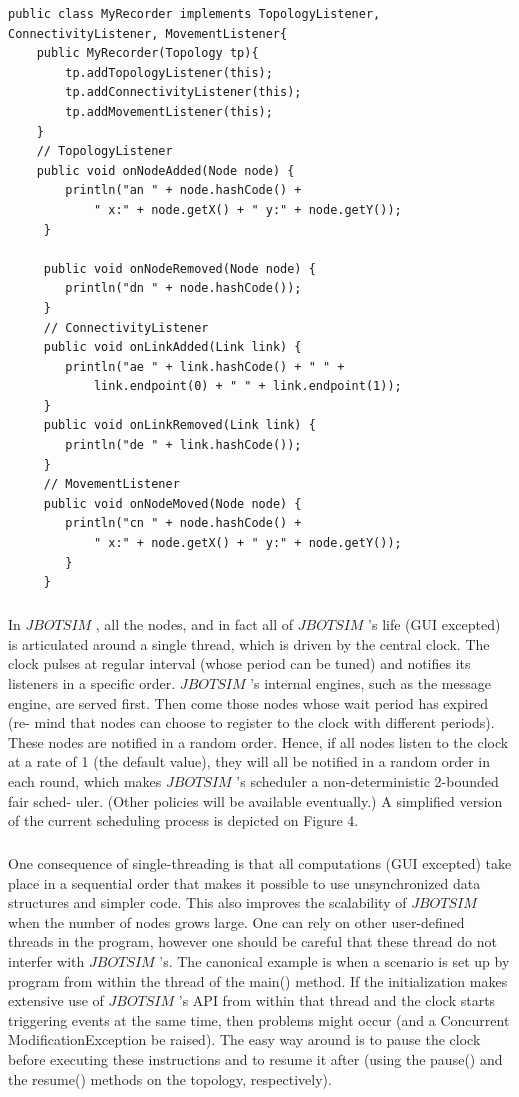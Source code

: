 \begin{lstlisting}[caption=Centralized version of Random Waypoint, captionpos=b]
public class MyRecorder implements TopologyListener, ConnectivityListener, MovementListener{
	public MyRecorder(Topology tp){
		tp.addTopologyListener(this);
		tp.addConnectivityListener(this);
		tp.addMovementListener(this);
	}
	// TopologyListener
	public void onNodeAdded(Node node) {
	 	println("an " + node.hashCode() +
	 		" x:" + node.getX() + " y:" + node.getY());
	 }
	 
	 public void onNodeRemoved(Node node) {
	 	println("dn " + node.hashCode());
	 }
	 // ConnectivityListener
	 public void onLinkAdded(Link link) {
	 	println("ae " + link.hashCode() + " " +
	 		link.endpoint(0) + " " + link.endpoint(1));
	 }
	 public void onLinkRemoved(Link link) {
	 	println("de " + link.hashCode());
	 }
	 // MovementListener
	 public void onNodeMoved(Node node) {
	 	println("cn " + node.hashCode() +
	 		" x:" + node.getX() + " y:" + node.getY());
	 	}
	 }
\end{lstlisting}
\subparagraph{}In  $JBOTSIM$ , all the nodes, and in fact all of  $JBOTSIM$ ’s life (GUI excepted) is articulated around a single thread, which is driven by the central clock. The clock pulses at regular interval (whose period can be tuned) and notifies its listeners in a specific order.  $JBOTSIM$ ’s internal engines, such as the message engine, are served first. Then come those nodes whose wait period has expired (re- mind that nodes can choose to register to the clock with different periods). These nodes are notified in a random order. Hence, if all nodes listen to the clock at a rate of 1 (the default value), they will all be notified in a random order in each round, which makes  $JBOTSIM$ ’s scheduler a non-deterministic 2-bounded fair sched- uler. (Other policies will be available eventually.) A simplified version of the current scheduling process is depicted on Figure 4.
\subparagraph{}One consequence of single-threading is that all computations (GUI excepted) take place in a sequential order that makes it possible to use unsynchronized data structures and simpler code. This also improves the scalability of $JBOTSIM$ when the number of nodes grows large. One can rely on other user-defined threads in the program, however one should be careful that these thread do not interfer with  $JBOTSIM$ ’s. The canonical example is when a scenario is set up by program from within the thread of the main() method. If the initialization makes extensive use of  $JBOTSIM$ ’s API from within that thread and the clock starts triggering events at the same time, then problems might occur (and a Concurrent ModificationException be raised). The easy way around is to pause the clock before executing these instructions and to resume it after (using the pause() and the resume() methods on the topology, respectively).
